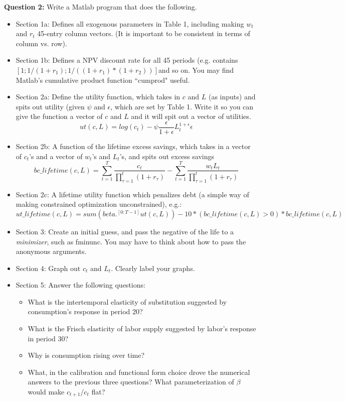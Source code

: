 \documentclass[11pt]{article}
\begin{document}
\textbf{Question 2:} Write a Matlab program that does the following.
\begin{itemize}
\item Section 1a:  Defines all exogenous parameters in Table 1, including making $w_t$ and $r_t$ 45-entry column vectors. (It is important to be consistent in terms of column vs. row).
\item Section 1b:  Defines a NPV discount rate for all 45 periods (e.g. contains $[1;1/(1+r_1);1/((1+r_1)*(1+r_2))] $and so on.  You may find Matlab's cumulative product function ``cumprod" useful.
\item Section 2a:  Define the utility function, which takes in $c$ and $L$ (as inputs) and spits out utility (given $\psi$ and $\epsilon$, which are set by Table 1.  Write it so you can give the function a vector of $c$ and $L$ and it will spit out a vector of utilities.
$$ut(c,L)=log(c_t)-\psi \frac{\epsilon}{1+\epsilon}L_t^{1+\epsilon}{\epsilon}$$
\item Section 2b:  A function of the lifetime excess savings, which takes in a vector of $c_t$'s and a vector of $w_t$'s and $L_t$'s, and spits out excess savings
$$bc\_lifetime(c,L)=\sum_{t=1}^T\frac{c_t}{\prod_{\tau=1}^t(1+r_\tau)}-\sum_{t=1}^T\frac{w_tL_t}{\prod_{\tau=1}^t(1+r_\tau)}$$
\item Section 2c:  A lifetime utility function which penalizes debt (a simple way of making constrained optimization unconstrained), e.g.:
$$ut\_lifetime(c,L) = sum(beta.^[0:T-1]ut(c,L))-10*(bc\_lifetime(c,L)>0)*bc\_lifetime(c,L)$$
\item Section 3:  Create an initial guess, and pass the negative of the life to a \emph{minimizer}, such as fminunc.  You may have to think about how to pass the anonymous arguments.
\item Section 4:  Graph out $c_t$ and $L_t$.  Clearly label your graphs.
\item Section 5:  Answer the following questions:
\begin{itemize}
\item What is the intertemporal elasticity of substitution suggested by consumption's response in period 20?  
\item What is the Frisch elasticity of labor supply suggested by labor's response in period 30?
\item Why is consumption rising over time?  
\item What, in the calibration and functional form choice drove the numerical answers to the previous three questions?  What parameterization of $\beta$ would make $c_{t+1}/c_t$ flat?
\end{itemize}
\end{itemize}
\end{document}
